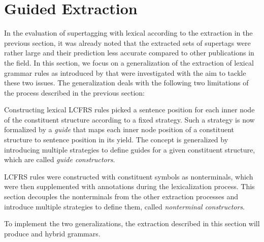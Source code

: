 \documentclass[../../document.tex]{subfiles}
\begin{document}
    \section{Guided Extraction} \label{sec:extraction:guided}
    In the evaluation of supertagging with lexical  according to the extraction in the previous section, it was already noted that the extracted sets of supertags were rather large and their prediction less accurate compared to other publications in the field. \cite{RupMoe21}
    In this section, we focus on a generalization of the extraction of lexical grammar rules as introduced by \citet{Rup22} that were investigated with the aim to tackle these two issues.
    The generalization deals with the following two limitations of the process described in the previous section:
    \begin{compactenum}
        \item
        Constructing lexical LCFRS rules picked a sentence position for each inner node of the constituent structure according to a fixed strategy.
        Such a strategy is now formalized by a \emph{guide} that maps each inner node position of a constituent structure to sentence position in its yield.
        The concept is generalized by introducing multiple strategies to define guides for a given constituent structure, which are called \emph{guide constructors}.
        \item
        LCFRS rules were constructed with constituent symbols as nonterminals, which were then supplemented with annotations during the lexicalization process.
        This section decouples the nonterminals from the other extraction processes and introduce multiple strategies to define them, called \emph{nonterminal constructors}.
    \end{compactenum}
    To implement the two generalizations, the extraction described in this section will produce  and hybrid grammars.
\end{document}
